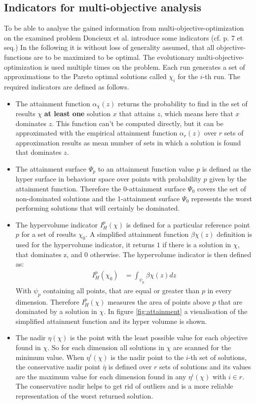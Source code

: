 \documentclass[12pt,twoside]{article}
\theoremstyle{plain}
\theoremstyle{definition}
\theoremstyle{remark}
\begin{document}
\subsection{Indicators for multi-objective analysis}
\label{back:indicators}
To be able to analyse the gained information from multi-objective-optimization on the examined problem Doncieux et al. introduce some indicators (cf. \cite{doncieux2015multi} p. 7 et seq.)
In the following it is without loss of generality assumed, that all objective-functions are to be maximized to be optimal.
The evolutionary multi-objective-optimization is used multiple times on the problem. Each run generates a set of approximations to the Pareto optimal solutions called $\chi_i$ for the $i$-th run.
The required indicators are defined as follows.
\begin{itemize}
	\item The attainment function $\alpha_\chi(z)$ returns the probability to find in the set of results $\chi$ \textbf{at least one} solution $x$ that attains $z$, which means here that $x$ dominates $z$. This function can't be computed directly, but it can be approximated with the empirical attainment function $\alpha_r(z)$ over $r$ sets of approximation results as mean number of sets in which a solution is found that dominates $z$.
	\item The attainment surface $\Psi_p$ to an attainment function value $p$ is defined as the hyper surface in behaviour space over points with probability $p$ given by the attainment function.
	Therefore the 0-attainment surface $\Psi_0$ covers the set of non-dominated solutions and the 1-attainment surface $\Psi_0$ represents the worst performing solutions that will certainly be dominated.
	\item The hypervolume indicator $I^p_H(\chi)$ is defined for a particular reference point $p$ for a set of results $\chi_0$. A simplified attainment function $\beta\chi(z)$ definition is used for the hypervolume indicator, it returns $1$ if there is a solution in $\chi$, that dominates z, and $0$ otherwise. The hypervolume indicator is then defined as:
	\begin{align*}
		I^p_H(\chi_0) &= \int_{\psi_p}\beta\chi(z) dz
	\end{align*}
	With $\psi_p$ containing all points, that are equal or greater than $p$ in every dimension.
	Therefore $I^p_H(\chi)$ measures the area of points above $p$ that are dominated by a solution in $\chi$.
	In figure \ref{fig:attainment} a visualisation of the simplified attainment function and its hyper volumne is shown.
	\item The nadir $\eta(\chi)$ is the point with the least possible value for each objective found in $\chi$. So for each dimension all solutions in $\chi$ are scanned for the minimum value.
	When $\eta^i(\chi)$ is the nadir point to the $i$-th set of solutions, the conservative nadir point $\bar{\eta}$ is defined over $r$ sets of solutions and its values are the maximum value for each dimension found in any $\eta^i(\chi)$ with $i\in r$. The conservative nadir helps to get rid of outliers and is a more reliable representation of the \glqq worst\grqq{} returned solution.
\end{itemize}
\end{document}
